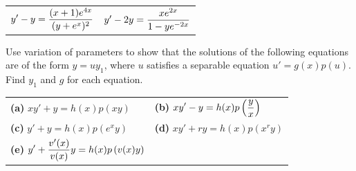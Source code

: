 \begin{exerciselist}
  \begin{tabular}[t]{@{}p{168pt}@{}p{168pt}}
    \item\label{exer:2.2.37} $\displaystyle{y'-y}=\frac{(x+1)e^{4x}}{(y+e^{x})^{2}}$ &
    \item\label{exer:2.2.38} $y'-2y=\displaystyle\frac{xe^{2x}}{1-ye^{-2x}}$
  \end{tabular}

  \item\label{exer:2.2.39} Use variation of parameters to show that the solutions of the following
        equations are of the form $y=uy_{1}$, where $u$ satisfies a separable equation
        $u'=g(x)p(u)$. Find $y_{1}$ and $g$ for each equation.

  \begin{tabular}[t]{@{}p{168pt}@{}p{168pt}}
    {\bf (a)} $xy'+y=h(x)p(xy)$                                      & {\bf (b)} $\displaystyle{xy'-y=h(x)p\left(\frac{y}{x}\right)}$ \\[2\jot]
    {\bf (c)} $y'+y=h(x)p(e^{x}y)$                                   & {\bf (d)} $xy'+ry=h(x)p(x^{r}y)$                      \\[2\jot]
    {\bf (e)} $\displaystyle{y'+\frac{v'(x)}{v(x)}y=h(x) p\left(v(x)y\right)}$
  \end{tabular}
\end{exerciselist}
